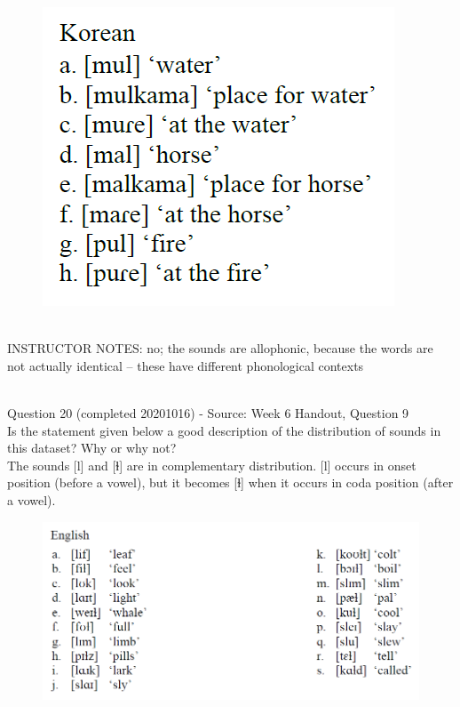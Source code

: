 \documentclass[12pt]{article}
\begin{document}
\begin{figure}[H]
\includegraphics{../images/korean.png}
\end{figure}

~\\
INSTRUCTOR NOTES: no; the sounds are allophonic, because the words are not actually identical -- these have different phonological contexts


~\\

{\large Question 20} (completed 20201016) - Source: Week 6 Handout, Question 9\\

Is the statement given below a good description of the distribution of sounds in this dataset? Why or why not?\\

The sounds {[l]} and {[ɫ]} are in complementary distribution. {[l]} occurs in onset position (before a vowel), but it becomes {[ɫ]} when it occurs in coda position (after a vowel).

\begin{figure}[H]
\includegraphics{../images/english_laterals.png}
\end{figure}
\end{document}

